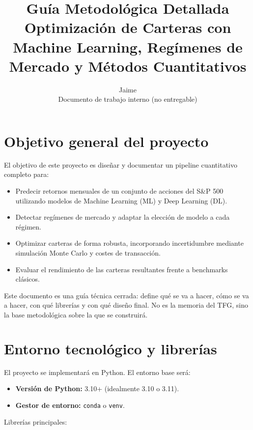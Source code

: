 \documentclass[12pt]{article}
\title{Guía Metodológica Detallada\\
Optimización de Carteras con Machine Learning, Regímenes de Mercado y Métodos Cuantitativos}
\author{Jaime\\\small Documento de trabajo interno (no entregable)}
\date{}
\begin{document}
\maketitle

\tableofcontents
\newpage

\section{Objetivo general del proyecto}

El objetivo de este proyecto es diseñar y documentar un pipeline cuantitativo completo para:

\begin{itemize}
    \item Predecir retornos mensuales de un conjunto de acciones del S\&P 500 utilizando modelos de Machine Learning (ML) y Deep Learning (DL).
    \item Detectar regímenes de mercado y adaptar la elección de modelo a cada régimen.
    \item Optimizar carteras de forma robusta, incorporando incertidumbre mediante simulación Monte Carlo y costes de transacción.
    \item Evaluar el rendimiento de las carteras resultantes frente a benchmarks clásicos.
\end{itemize}

Este documento es una guía técnica cerrada: define qué se va a hacer, cómo se va a hacer, con qué librerías y con qué diseño final. No es la memoria del TFG, sino la base metodológica sobre la que se construirá.

\section{Entorno tecnológico y librerías}

El proyecto se implementará en Python. El entorno base será:

\begin{itemize}
    \item \textbf{Versión de Python:} 3.10+ (idealmente 3.10 o 3.11).
    \item \textbf{Gestor de entorno:} \texttt{conda} o \texttt{venv}.
\end{itemize}

Librerías principales:
\end{document}
